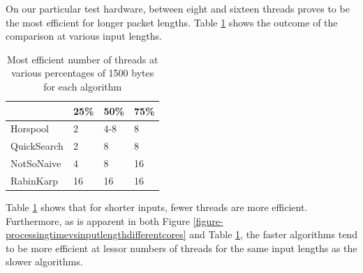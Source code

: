 \documentclass[11pt]{article}
\begin{document}
On our particular test hardware, between eight and sixteen threads proves to be the most efficient for longer packet lengths. Table \ref{table-threadcompare} shows the outcome of the comparison at various input lengths.


\begin{table}[!htb]
\centering
\begin{tabular}{@{}llll@{}}
\toprule
 & 25\% & 50\% & 75\% \\ \midrule
Horspool & 2 & 4-8 & 8 \\
QuickSearch & 2 & 8 & 8 \\
NotSoNaive & 4 & 8 & 16 \\
RabinKarp & 16 & 16 & 16 \\ \bottomrule
\end{tabular}
\caption{Most efficient number of threads at various percentages of 1500 bytes for each algorithm}
\label{table-threadcompare}
\end{table}

Table \ref{table-threadcompare} shows that for shorter inputs, fewer threads are more efficient. Furthermore, as is apparent in both Figure \ref{figure-processingtimevsinputlengthdifferentcores} and Table \ref{table-threadcompare}, the faster algorithms tend to be more efficient at lessor numbers of threads for the same input lengths as the slower algorithms.



\end{document}
